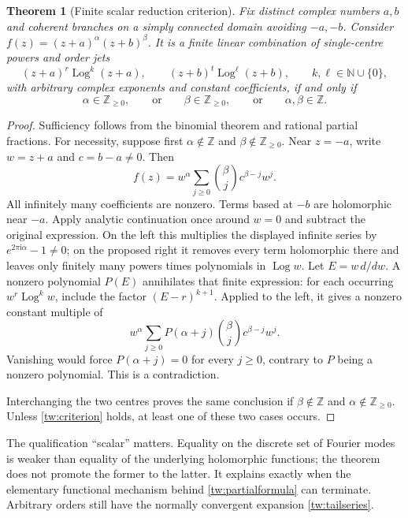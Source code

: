 \documentclass[11pt,a4paper]{article}
\numberwithin{equation}{section}
\newtheorem{theorem}{Theorem}[section]
\theoremstyle{definition}
\theoremstyle{remark}
\DeclareMathOperator{\Log}{Log}
\newcommand{\N}{\mathbb N}
\newcommand{\Z}{\mathbb Z}
\newcommand{\ii}{\mathrm i}
\begin{document}
\begin{theorem}[Finite scalar reduction criterion]
\label{tw:classification}
Fix distinct complex numbers $a,b$ and coherent branches on a simply
connected domain avoiding $-a,-b$. Consider
$f(z)=(z+a)^\alpha(z+b)^\beta$. It is a finite linear combination
of single-centre powers and order jets
\[
 (z+a)^r\Log^k(z+a),\qquad (z+b)^t\Log^\ell(z+b),
 \qquad k,\ell\in\N\cup\{0\},
\]
with arbitrary complex exponents and constant coefficients, if and only if
\begin{equation}
 \alpha\in\Z_{\ge0},\qquad\text{or}\qquad
 \beta\in\Z_{\ge0},\qquad\text{or}\qquad
 \alpha,\beta\in\Z.
 \label{tw:criterion}
\end{equation}
\end{theorem}

\begin{proof}
Sufficiency follows from the binomial theorem and rational partial
fractions. For necessity, suppose first $\alpha\notin\Z$ and
$\beta\notin\Z_{\ge0}$. Near $z=-a$, write $w=z+a$ and
$c=b-a\ne0$. Then
\[
 f(z)=w^\alpha\sum_{j\ge0}\binom\beta j c^{\beta-j}w^j.
\]
All infinitely many coefficients are nonzero. Terms based at $-b$
are holomorphic near $-a$. Apply analytic continuation once around
$w=0$ and subtract the original expression. On the left this
multiplies the displayed infinite series by
$e^{2\pi\ii\alpha}-1\ne0$; on the proposed right it removes every
term holomorphic there and leaves only finitely many powers times
polynomials in $\Log w$. Let $E=w\,d/dw$. A nonzero polynomial $P(E)$ annihilates that
finite expression: for each occurring $w^r\Log^k w$, include the
factor $(E-r)^{k+1}$. Applied to the left, it gives a nonzero constant
multiple of
\[
 w^\alpha\sum_{j\ge0}P(\alpha+j)
                    \binom\beta j c^{\beta-j}w^j.
\]
Vanishing would force $P(\alpha+j)=0$ for every $j\ge0$, contrary
to $P$ being a nonzero polynomial. This is a contradiction.

Interchanging the two centres proves the same conclusion if
$\beta\notin\Z$ and $\alpha\notin\Z_{\ge0}$. Unless
\eqref{tw:criterion} holds, at least one of these two cases occurs.
\end{proof}

The qualification ``scalar'' matters. Equality on the discrete set of
Fourier modes is weaker than equality of the underlying holomorphic
functions; the theorem does not promote the former to the latter.
It explains exactly when the elementary functional mechanism behind
\eqref{tw:partialformula} can terminate. Arbitrary orders still have
the normally convergent expansion \eqref{tw:tailseries}.
\end{document}
